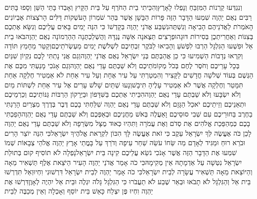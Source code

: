 \documentclass[../main/main.tex]{subfiles}
\begin{document}
\begin{multicols*}{\ncols}
וְנִגְדְּעוּ קַרְנוֹת הַמִּזְבֵּחַ וְנָפְלוּ לָאָרֶץ\PreVerseSpace{}וְהִכֵּיתִי בֵית הַחֹרֶף עַל בֵּית הַקָּיִץ וְאָבְדוּ בָּתֵּי הַשֵּׁן וְסָפוּ בָּתִּים רַבִּים נְאֻם יַהְוֶה \ClosedSection{}שִׁמְעוּ הַדָּבָר הַזֶּה פָּרוֹת הַבָּשָׁן אֲשֶׁר בְּהַר שֹׁמְרוֹן הָעֹשְׁקוֹת דַּלִּים הָרֹצְצוֹת אֶבְיוֹנִים הָאֹמְרֹת לַאֲדֹנֵיהֶם הָבִיאָה וְנִשְׁתֶּה\PreVerseSpace{}נִשְׁבַּע אֲדֹנַי יַהְוֶה בְּקָדְשׁוֹ כִּי הִנֵּה יָמִים בָּאִים עֲלֵיכֶם וְנִשָּׂא אֶתְכֶם בְּצִנּוֹת וְאַחֲרִיתְכֶן בְּסִירוֹת דּוּגָה\PreVerseSpace{}וּפְרָצִים תֵּצֶאנָה אִשָּׁה נֶגְדָּהּ וְהֻשְׁלַכְתֶּנָה\SubEnd{} הַהַרְמוֹנָה נְאֻם יַהְוֶה\PreVerseSpace{}בֹּאוּ בֵית אֵל וּפִשְׁעוּ הַגִּלְגָּל הַרְבּוּ לִפְשֹׁעַ וְהָבִיאוּ לַבֹּקֶר זִבְחֵיכֶם לִשְׁלֹשֶׁת יָמִים מַעְשְׂרֹתֵיכֶם\PreVerseSpace{}וְקַטֵּר מֵחָמֵץ תּוֹדָה וְקִרְאוּ נְדָבוֹת הַשְׁמִיעוּ כִּי כֵן אֲהַבְתֶּם בְּנֵי יִשְׂרָאֵל נְאֻם אֲדֹנַי יַהְוֶה\PreVerseSpace{}וְגַם אֲנִי נָתַתִּי לָכֶם נִקְיוֹן שִׁנַּיִם בְּכָל עָרֵיכֶם וְחֹסֶר לֶחֶם בְּכֹל מְקוֹמֹתֵיכֶם וְלֹא שַׁבְתֶּם עָדַי נְאֻם יַהְוֶה\PreVerseSpace{}וְגַם אָנֹכִי מָנַעְתִּי מִכֶּם אֶת הַגֶּשֶׁם בְּעוֹד שְׁלֹשָׁה חֳדָשִׁים לַקָּצִיר וְהִמְטַרְתִּי עַל עִיר אֶחָת וְעַל עִיר אַחַת לֹא אַמְטִיר חֶלְקָה אַחַת תִּמָּטֵר וְחֶלְקָה אֲשֶׁר לֹא אַמְטִיר\SubEnd{} עָלֶיהָ תִּיבָשׁ\PreVerseSpace{}וְנָעוּ שְׁתַּיִם שָׁלֹשׁ עָרִים אֶל עִיר אַחַת לִשְׁתּוֹת מַיִם וְלֹא יִשְׂבָּעוּ וְלֹא שַׁבְתֶּם עָדַי נְאֻם יַהְוֶה\PreVerseSpace{}הִכֵּיתִי אֶתְכֶם בַּשִּׁדָּפוֹן וּבַיֵּרָקוֹן הַרְבּוֹת גַּנּוֹתֵיכֶם וְכַרְמֵיכֶם וּתְאֵנֵיכֶם וְזֵיתֵיכֶם יֹאכַל הַגָּזָם וְלֹא שַׁבְתֶּם עָדַי נְאֻם יַהְוֶה \ClosedSection{}שִׁלַּחְתִּי בָכֶם דֶּבֶר בְּדֶרֶךְ מִצְרַיִם הָרַגְתִּי בַחֶרֶב בַּחוּרֵיכֶם עִם שְׁבִי סוּסֵיכֶם וָאַעֲלֶה בְּאֹשׁ מַחֲנֵיכֶם וּבְאַפְּכֶם וְלֹא שַׁבְתֶּם עָדַי נְאֻם יַהְוֶה\PreVerseSpace{}הָפַכְתִּי בָכֶם כְּמַהְפֵּכַת אֱלֹהִים אֶת סְדֹם וְאֶת עֲמֹרָה וַתִּהְיוּ כְּאוּד מֻצָּל מִשְּׂרֵפָה וְלֹא שַׁבְתֶּם עָדַי נְאֻם יַהְוֶה \ClosedSection{}לָכֵן כֹּה אֶעֱשֶׂה לְּךָ יִשְׂרָאֵל עֵקֶב כִּי זֹאת אֶעֱשֶׂה לָּךְ הִכּוֹן לִקְרַאת אֱלֹהֶיךָ יִשְׂרָאֵל\PreVerseSpace{}כִּי הִנֵּה יוֹצֵר הָרִים וּבֹרֵא רוּחַ וּמַגִּיד לְאָדָם מַה שֵּׂחוֹ עֹשֵׂה שַׁחַר עֵיפָה וְדֹרֵךְ עַל בָּמֳתֵי אָרֶץ יַהְוֶה אֱלֹהֵי צְבָאוֹת שְׁמוֹ \ClosedSection{}שִׁמְעוּ אֶת הַדָּבָר הַזֶּה אֲשֶׁר אָנֹכִי נֹשֵׂא עֲלֵיכֶם קִינָה בֵּית יִשְׂרָאֵל\PreVerseSpace{}נָפְלָה לֹא תוֹסִיף קוּם בְּתוּלַת יִשְׂרָאֵל נִטְּשָׁה עַל אַדְמָתָהּ אֵין מְקִימָהּ\PreVerseSpace{}כִּי כֹה אָמַר אֲדֹנַי יַהְוֶה הָעִיר הַיֹּצֵאת אֶלֶף תַּשְׁאִיר מֵאָה וְהַיּוֹצֵאת מֵאָה תַּשְׁאִיר עֲשָׂרָה לְבֵית יִשְׂרָאֵל\PreVerseSpace{}כִּי כֹה אָמַר יַהְוֶה לְבֵית יִשְׂרָאֵל דִּרְשׁוּנִי וִחְיוּ\PreVerseSpace{}וְאַל תִּדְרְשׁוּ בֵּית אֵל וְהַגִּלְגָּל לֹא תָבֹאוּ וּבְאֵר שֶׁבַע לֹא תַעֲבֹרוּ כִּי הַגִּלְגָּל גָּלֹה יִגְלֶה וּבֵית אֵל יִהְיֶה לְאָוֶן\PreVerseSpace{}דִּרְשׁוּ אֶת יַהְוֶה וִחְיוּ פֶּן יִצְלַח כָּאֵשׁ בֵּית יוֹסֵף וְאָכְלָה וְאֵין מְכַבֶּה לְבֵית 
\end{multicols*}
\end{document}
